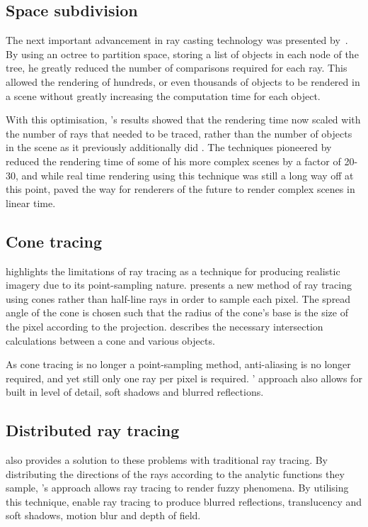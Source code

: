 \subsection{Space subdivision}
The next important advancement in ray casting technology was presented by~\cite{glassner84space}. By using an octree to partition space, storing a list of objects in each node of the tree, he greatly reduced the number of comparisons required for each ray. This allowed the rendering of hundreds, or even thousands of objects to be rendered in a scene without greatly increasing the computation time for each object. 

With this optimisation, \citeauthor{glassner84space}'s results showed that the rendering time now scaled with the number of rays that needed to be traced, rather than the number of objects in the scene as it previously additionally did \parencite{glassner84space}. The techniques pioneered by \citeauthor{glassner84space} reduced the rendering time of some of his more complex scenes by a factor of 20-30, and while real time rendering using this technique was still a long way off at this point, paved the way for renderers of the future to render complex scenes in linear time.

\subsection{Cone tracing}
\cite{amanatides84conetracing} highlights the limitations of ray tracing as a technique for producing realistic imagery due to its point-sampling nature. \citeauthor{amanatides84conetracing} presents a new method of ray tracing using cones rather than half-line rays in order to sample each pixel. The spread angle of the cone is chosen such that the radius of the cone's base is the size of the pixel according to the projection. \citeauthor{amanatides84conetracing} describes the necessary intersection calculations between a cone and various objects.

As cone tracing is no longer a point-sampling method, anti-aliasing is no longer required, and yet still only one ray per pixel is required. \citeauthor{amanatides84conetracing}' approach also allows for built in level of detail, soft shadows and blurred reflections.

\subsection{Distributed ray tracing}
\cite{cook84distributed} also provides a solution to these problems with traditional ray tracing. By distributing the directions of the rays according to the analytic functions they sample, \citeauthor{cook84distributed}'s approach allows ray tracing to render fuzzy phenomena. By utilising this technique, \citeauthor{cook84distributed} enable ray tracing to produce blurred reflections, translucency and soft shadows, motion blur and depth of field.

